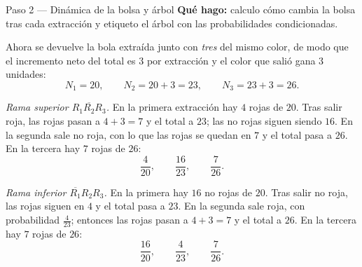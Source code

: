 \documentclass[11pt]{article}
\begin{document}
\begin{paso}{Paso 2 --- Dinámica de la bolsa y árbol}
\textbf{Qué hago:} calculo cómo cambia la bolsa tras cada extracción y etiqueto el árbol con las probabilidades condicionadas.

Ahora se devuelve la bola extraída junto con \emph{tres} del mismo color, de modo que el incremento neto del total es $3$ por extracción y el color que salió gana $3$ unidades:
\[
N_1=20,\qquad N_2=20+3=23,\qquad N_3=23+3=26 .
\]

\emph{Rama superior $R_1\overline{R_2}R_3$.} En la primera extracción hay $4$ rojas de $20$. Tras salir roja, las rojas pasan a $4+3=7$ y el total a $23$; las no rojas siguen siendo $16$. En la segunda sale no roja, con lo que las rojas se quedan en $7$ y el total pasa a $26$. En la tercera hay $7$ rojas de $26$:
\[
\frac{4}{20},\qquad \frac{16}{23},\qquad \frac{7}{26}.
\]

\emph{Rama inferior $\overline{R_1}R_2R_3$.} En la primera hay $16$ no rojas de $20$. Tras salir no roja, las rojas siguen en $4$ y el total pasa a $23$. En la segunda sale roja, con probabilidad $\tfrac{4}{23}$; entonces las rojas pasan a $4+3=7$ y el total a $26$. En la tercera hay $7$ rojas de $26$:
\[
\frac{16}{20},\qquad \frac{4}{23},\qquad \frac{7}{26}.
\]

\begin{center}
\end{center}


\end{paso}
\end{document}
